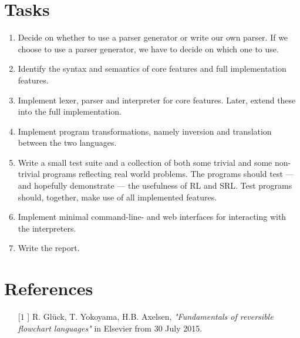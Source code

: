 \section{Tasks}
\label{sec:tasks}

\begin{enumerate}

  \item Decide on whether to use a parser generator or write our own parser. If we choose to use a parser generator, we have to decide on which one to use.

  \item Identify the syntax and semantics of core features and full implementation features.

  \item Implement lexer, parser and interpreter for core features. Later, extend these into the full implementation.

  \item Implement program transformations, namely inversion and translation between the two languages.

  \item Write a small test suite and a collection of both some trivial and some non-trivial programs reflecting real world problems. The programs should test --- and hopefully demonstrate --- the usefulness of RL and SRL. Test programs should, together, make use of all implemented features.

  \item Implement minimal command-line- and web interfaces for interacting with the interpreters.

  \item Write the report.

\end{enumerate}


\appendix
\section{References}

\begin{enumerate}
  \item[[$1$]] R. Glück, T. Yokoyama, H.B. Axelsen, \textit{"Fundamentals of reversible flowchart languages"} in Elsevier from 30 July 2015.
\end{enumerate}
